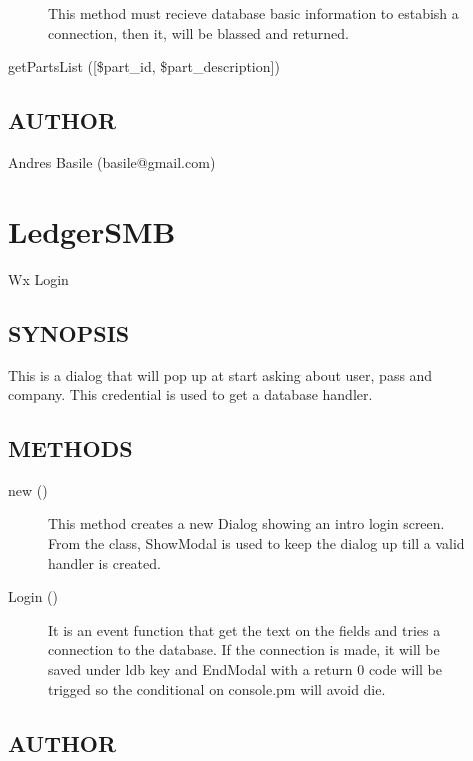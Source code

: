 \begin{description}
\begin{description}
This method must recieve database basic information to estabish a connection, then it, will be blassed
and returned.


\item[{getPartsList ([\$part\_id, \$part\_description])}] \mbox{}\end{description}
\subsection*{AUTHOR\label{LedgerSMB_AUTHOR}}


Andres Basile (basile@gmail.com)

\section{LedgerSMB\label{LedgerSMB}}


Wx Login

\subsection*{SYNOPSIS\label{LedgerSMB_SYNOPSIS}}


This is a dialog that will pop up at start asking about user, pass and company. This credential is used to get a database handler.

\subsection*{METHODS\label{LedgerSMB_METHODS}}
\begin{description}

\item[{new ()}] \mbox{}

This method creates a new Dialog showing an intro login screen. From the class, ShowModal is used to keep the dialog up till a valid handler is created.


\item[{Login ()}] \mbox{}

It is an event function that get the text on the fields and tries a connection to the database.
If the connection is made, it will be saved under ldb key and EndModal with a return 0 code will
be trigged so the conditional on console.pm will avoid die.

\end{description}
\subsection*{AUTHOR\label{LedgerSMB_AUTHOR}}



\end{description}
